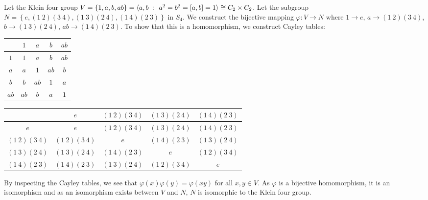 \documentclass{article}
\begin{document}
\problem
{}
Let the Klein four group $V = \left\{1, a, b, ab\right\} = \langle a,b \ : \  a^2 = b^2 = \left[a,b\right] = 1\rangle \cong C_2 \times C_2$. Let the subgroup $N = \left\{ e, \left(1~2\right)\left(3~4\right), \left(1~3\right)\left(2~4\right), \left(1~4\right)\left(2~3\right)\right\}$ in $S_4$. We construct the bijective mapping $\varphi : V \to N$ where $1 \to e$, $a \to \left(1~2\right)\left(3~4\right)$, $b \to \left(1~3\right)\left(2~4\right)$, $ab \to \left(1~4\right)\left(2~3\right)$. To show that this is a homomorphism, we construct Cayley tables:
\begin{center}
\begin{tabular}{|c||c|c|c|c|}
    \hline
     & $1$ & $a$ & $b$ & $ab$ \\
    \hline
    \hline
    $1$ & $1$ & $a$ & $b$ & $ab$ \\
    \hline
    $a$ & $a$ & $1$ & $ab$ & $b$ \\
    \hline
    $b$ & $b$ & $ab$ & $1$ & $a$ \\
    \hline
    $ab$ & $ab$ & $b$ & $a$ & $1$ \\
    \hline
\end{tabular}


\vspace{0.25in}

\begin{tabular}{|c||c|c|c|c|}
    \hline
     & $e$ & $\left(1~2\right)\left(3~4\right)$ & $\left(1~3\right)\left(2~4\right)$ & $\left(1~4\right)\left(2~3\right)$ \\
    \hline
    \hline
    $e$ & $e$ & $\left(1~2\right)\left(3~4\right)$ & $\left(1~3\right)\left(2~4\right)$ & $\left(1~4\right)\left(2~3\right)$ \\
    \hline
    $\left(1~2\right)\left(3~4\right)$ & $\left(1~2\right)\left(3~4\right)$ & $e$ & $\left(1~4\right)\left(2~3\right)$ & $\left(1~3\right)\left(2~4\right)$ \\
    \hline
    $\left(1~3\right)\left(2~4\right)$ & $\left(1~3\right)\left(2~4\right)$ & $\left(1~4\right)\left(2~3\right)$ & $e$ & $\left(1~2\right)\left(3~4\right)$ \\
    \hline
    $\left(1~4\right)\left(2~3\right)$ & $\left(1~4\right)\left(2~3\right)$ & $\left(1~3\right)\left(2~4\right)$ & $\left(1~2\right)\left(3~4\right)$ & $e$ \\
    \hline
\end{tabular}
\end{center}
By inspecting the Cayley tables, we see that $\varphi\left(x\right)\varphi\left(y\right) = \varphi\left(xy\right)$ for all $x, y \in V$. As $\varphi$ is a bijective homomorphism, it is an isomorphism and as an isomorphism exists between $V$ and $N$, $N$ is isomorphic to the Klein four group.
\end{document}
